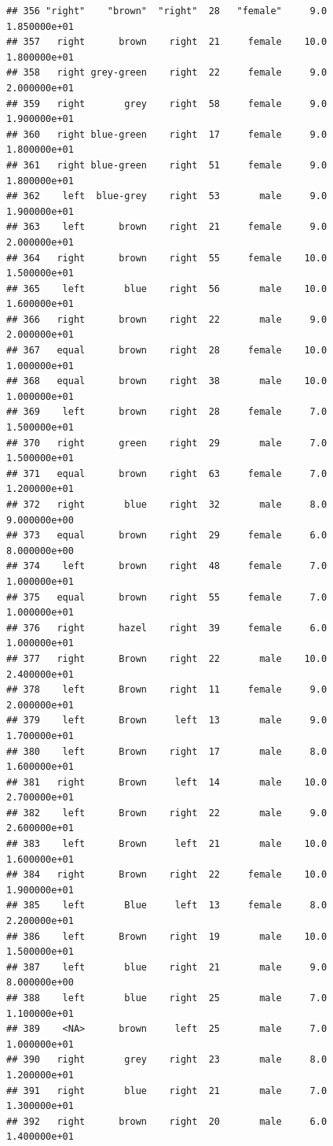 \documentclass[]{article}
\begin{document}
\begin{verbatim}
## 356 "right"    "brown"  "right"  28   "female"     9.0  1.850000e+01
## 357   right      brown    right  21     female    10.0  1.800000e+01
## 358   right grey-green    right  22     female     9.0  2.000000e+01
## 359   right       grey    right  58     female     9.0  1.900000e+01
## 360   right blue-green    right  17     female     9.0  1.800000e+01
## 361   right blue-green    right  51     female     9.0  1.800000e+01
## 362    left  blue-grey    right  53       male     9.0  1.900000e+01
## 363    left      brown    right  21     female     9.0  2.000000e+01
## 364   right      brown    right  55     female    10.0  1.500000e+01
## 365    left       blue    right  56       male    10.0  1.600000e+01
## 366   right      brown    right  22       male     9.0  2.000000e+01
## 367   equal      brown    right  28     female    10.0  1.000000e+01
## 368   equal      brown    right  38       male    10.0  1.000000e+01
## 369    left      brown    right  28     female     7.0  1.500000e+01
## 370   right      green    right  29       male     7.0  1.500000e+01
## 371   equal      brown    right  63     female     7.0  1.200000e+01
## 372   right       blue    right  32       male     8.0  9.000000e+00
## 373   equal      brown    right  29     female     6.0  8.000000e+00
## 374    left      brown    right  48     female     7.0  1.000000e+01
## 375   equal      brown    right  55     female     7.0  1.000000e+01
## 376   right      hazel    right  39     female     6.0  1.000000e+01
## 377   right      Brown    right  22       male    10.0  2.400000e+01
## 378    left      Brown    right  11     female     9.0  2.000000e+01
## 379    left      Brown     left  13       male     9.0  1.700000e+01
## 380    left      Brown    right  17       male     8.0  1.600000e+01
## 381   right      Brown     left  14       male    10.0  2.700000e+01
## 382    left      Brown    right  22       male     9.0  2.600000e+01
## 383    left      Brown     left  21       male    10.0  1.600000e+01
## 384   right      Brown    right  22     female    10.0  1.900000e+01
## 385    left       Blue     left  13     female     8.0  2.200000e+01
## 386    left      Brown    right  19       male    10.0  1.500000e+01
## 387    left       blue    right  21       male     9.0  8.000000e+00
## 388    left       blue    right  25       male     7.0  1.100000e+01
## 389    <NA>      brown     left  25       male     7.0  1.000000e+01
## 390   right       grey    right  23       male     8.0  1.200000e+01
## 391   right       blue    right  21       male     7.0  1.300000e+01
## 392   right      brown    right  20       male     6.0  1.400000e+01

\end{verbatim}
\end{document}
